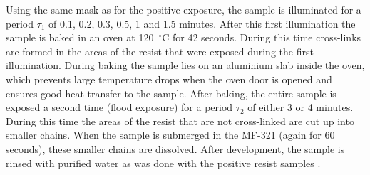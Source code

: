 Using the same mask as for the positive exposure, the sample is illuminated for a period $\tau_1$ of 0.1, 0.2, 0.3, 0.5, 1 and 1.5 minutes. After this first illumination the sample is baked in an oven at 120~$^\circ$C for 42 seconds. During this time cross-links are formed in the areas of the resist that were exposed during the first illumination. During baking the sample lies on an aluminium slab inside the oven, which prevents large temperature drops when the oven door is opened and ensures good heat transfer to the sample. After baking, the entire sample is exposed a second time (flood exposure) for a period $\tau_2$ of either 3 or 4 minutes. During this time the areas of the resist that are not cross-linked are cut up into smaller chains. When the sample is submerged in the MF-321 (again for 60 seconds), these smaller chains are dissolved. After development, the sample is rinsed with purified water as was done with the positive resist samples \cite{az5214}.


